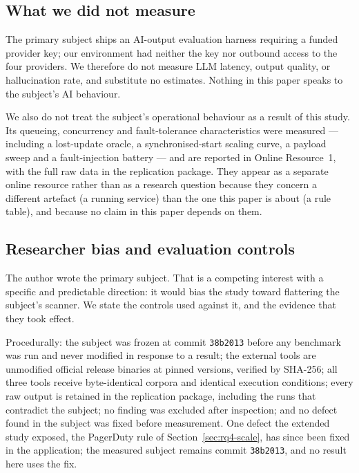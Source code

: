 \documentclass[pdflatex,sn-basic]{sn-jnl}
\begin{document}
\subsection{What we did not measure}
\label{sec:notmeasured}

The primary subject ships an AI-output evaluation harness requiring a funded provider key; our environment had neither the key nor outbound access to the four providers. We therefore do not measure LLM latency, output quality, or hallucination rate, and substitute no estimates. Nothing in this paper speaks to the subject's AI behaviour.

We also do not treat the subject's operational behaviour as a result of this study. Its queueing, concurrency and fault-tolerance characteristics were measured --- including a lost-update oracle, a synchronised-start scaling curve, a payload sweep and a fault-injection battery --- and are reported in Online Resource~1, with the full raw data in the replication package. They appear as a separate online resource rather than as a research question because they concern a different artefact (a running service) than the one this paper is about (a rule table), and because no claim in this paper depends on them.

\subsection{Researcher bias and evaluation controls}
\label{sec:bias}

The author wrote the primary subject. That is a competing interest with a specific and predictable direction: it would bias the study toward flattering the subject's scanner. We state the controls used against it, and the evidence that they took effect.

Procedurally: the subject was frozen at commit \texttt{38b2013} before any benchmark was run and never modified in response to a result; the external tools are unmodified official release binaries at pinned versions, verified by SHA-256; all three tools receive byte-identical corpora and identical execution conditions; every raw output is retained in the replication package, including the runs that contradict the subject; no finding was excluded after inspection; and no defect found in the subject was fixed before measurement. One defect the extended study exposed, the PagerDuty rule of Section~\ref{sec:rq4-scale}, has since been fixed in the application; the measured subject remains commit \texttt{38b2013}, and no result here uses the fix.
\end{document}
